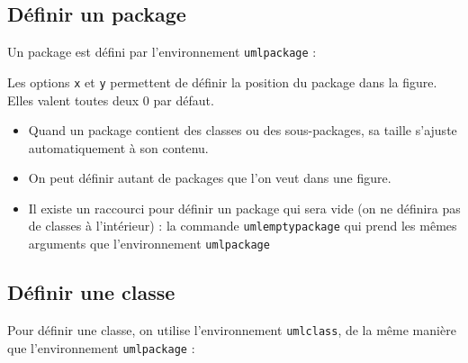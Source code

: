 \documentclass[a4paper,11pt]{report}
\newcommand{\inputTikZ}[1]{%
  }%
\newcommand{\inputTikZ}[1]{%
    \texttt{[image: fig/\#1.pdf]}%
  }%
\begin{document}
\subsection{Définir un package}\label{ss.package}

Un package est défini par l'environnement {\tt umlpackage} :

\medskip

\begin{minipage}{0.5\textwidth}

\end{minipage}
\begin{minipage}{0.4\textwidth}
\begin{center}
\inputTikZ{package}
\end{center}
\end{minipage}

\medskip

Les options {\tt x} et {\tt y} permettent de définir la position du package dans la figure. Elles valent toutes deux 0 par défaut. 

\begin{itemize}
\item Quand un package contient des classes ou des sous-packages, sa taille s'ajuste automatiquement à son contenu.
\item On peut définir autant de packages que l'on veut dans une figure.
\item Il existe un raccourci pour définir un package qui sera vide (on ne définira pas de classes à l'intérieur) : la commande {\tt umlemptypackage} qui prend les mêmes arguments que l'environnement {\tt umlpackage}
\end{itemize}

\subsection{Définir une classe}\label{ss.class}

Pour définir une classe, on utilise l'environnement {\tt umlclass}, de la même manière que l'environnement {\tt umlpackage} :

\medskip

\begin{minipage}{0.5\textwidth}

\end{minipage}
\begin{minipage}{0.4\textwidth}
\begin{center}
\inputTikZ{class}
\end{center}
\end{minipage}
\end{document}
